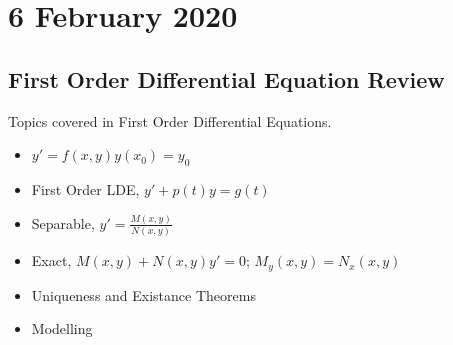\documentclass[twoside]{report}
\begin{document}
    \chapter{6 February 2020}
    \section{First Order Differential Equation Review}
    Topics covered in First Order Differential Equations.
    \begin{itemize}
        \item $y' = f(x, y)$\quad$y(x_{0}) = y_{0}$
        \item First Order LDE, $y' + p(t)y = g(t)$
        \item Separable, $y' = \frac{M(x, y)}{N(x, y)}$
        \item Exact, $M(x, y) + N(x, y)y' = 0$; $M_{y}(x, y) = N_{x}(x, y)$
        \item Uniqueness and Existance Theorems
        \item Modelling
    \end{itemize}
\end{document}
